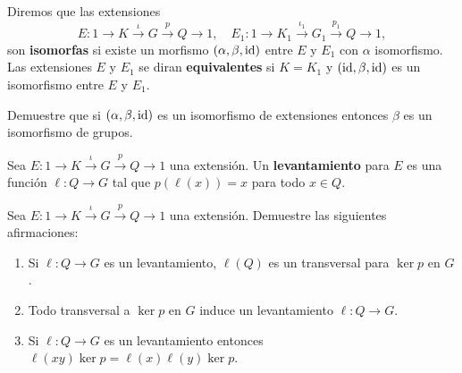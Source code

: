 \begin{definition}
	Diremos que las extensiones 
	\[
	E\colon 1\to K\xrightarrow{\iota}G\xrightarrow{p} Q\to1,
	\quad
	E_1\colon 1\to K_1\xrightarrow{\iota_1}G_1\xrightarrow{p_1} Q\to1,
	\]
	son \textbf{isomorfas} si existe un morfismo $(\alpha,\beta,\operatorname{id})$ entre $E$
	y $E_1$ con $\alpha$ isomorfismo. Las extensiones $E$ y $E_1$ se diran
	\textbf{equivalentes} si $K=K_1$ y $(\operatorname{id},\beta,\operatorname{id})$ es un isomorfismo
	entre $E$ y $E_1$.
\end{definition}

\begin{exercise}
	Demuestre que si $(\alpha,\beta,\operatorname{id})$ es un isomorfismo de extensiones
	entonces $\beta$ es un isomorfismo de grupos.
\end{exercise}

	

%

\begin{definition}
	Sea $E\colon 1\to K\xrightarrow{\iota}G\xrightarrow{p} Q\to1$ una
	extensión.  Un \textbf{levantamiento} para $E$ es una función $\ell\colon
	Q\to G$ tal que $p(\ell(x))=x$ para todo $x\in Q$. 
\end{definition}

\begin{exercise}
	\label{exercise:lifting}
	Sea $E\colon 1\to K\xrightarrow{\iota}G\xrightarrow{p} Q\to1$ una
	extensión.  Demuestre las siguientes afirmaciones:
	\begin{enumerate}
		\item Si $\ell\colon Q\to G$ es un levantamiento, $\ell(Q)$
			es un transversal para $\ker p$ en $G$.
		\item Todo transversal a $\ker p$ en $G$ induce un levantamiento $\ell\colon
			Q\to G$.
		\item Si $\ell\colon Q\to G$ es un levantamiento entonces
			$\ell(xy)\ker p=\ell(x)\ell(y)\ker p$.
	\end{enumerate}
\end{exercise}

